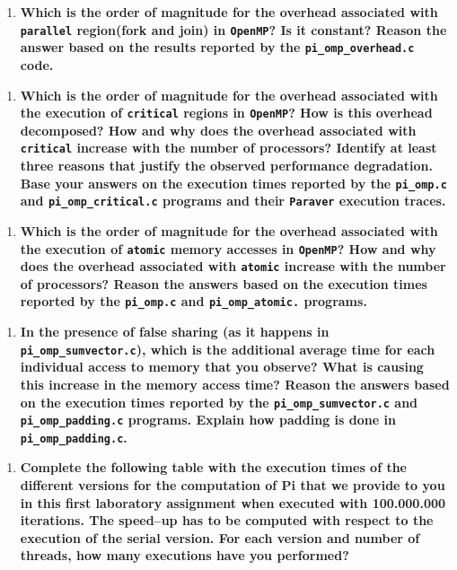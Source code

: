 \documentclass[a4paper]{article}
\begin{document}
\begin{enumerate}
	\item \textbf{Which is the order of magnitude for the overhead associated with \texttt{parallel} region(fork and join) in \texttt{OpenMP}? Is it constant? Reason the answer based on the results reported by the \texttt{pi\_omp\_overhead.c} code.}
\end{enumerate}

\begin{enumerate}[resume]
	\item \textbf{Which is the order of magnitude for the overhead associated with the execution of \texttt{critical} regions in \texttt{OpenMP}? How is this overhead decomposed? How and why does the overhead associated with \texttt{critical} increase with the number of processors? Identify at least three reasons that justify the observed performance degradation. Base your answers on the execution times reported by the \texttt{pi\_omp.c} and \texttt{pi\_omp\_critical.c} programs and their \texttt{Paraver} execution traces.}
\end{enumerate}

\begin{enumerate}[resume]
	\item \textbf{Which is the order of magnitude for the overhead associated with the execution of \texttt{atomic} memory accesses in \texttt{OpenMP}? How and why does the overhead associated with \texttt{atomic} increase with the number of processors? Reason the answers based on the execution times reported by the \texttt{pi\_omp.c} and \texttt{pi\_omp\_atomic.} programs.}
\end{enumerate}

\begin{enumerate}[resume]
	\item \textbf{In the presence of false sharing (as it happens in \texttt{pi\_omp\_sumvector.c}), which is the additional average time for each individual access to memory that you observe? What is causing this increase in the memory access time? Reason the answers based on the execution times reported by the \texttt{pi\_omp\_sumvector.c} and \texttt{pi\_omp\_padding.c} programs. Explain how padding is done in \texttt{pi\_omp\_padding.c}.}
\end{enumerate}

\begin{enumerate}[resume]
	\item \textbf{ Complete the following table with the execution times of the different versions for the computation of Pi that we provide to you in this first laboratory assignment when executed with 100.000.000 iterations. The speed–up has to be computed with respect to the execution of the serial version. For each version and number of threads, how many executions have you performed? }
\end{enumerate}
\end{document}
